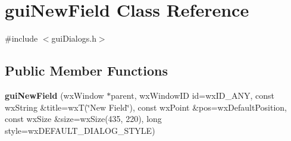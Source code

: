 \hypertarget{classgui_new_field}{
\section{guiNewField Class Reference}
\label{classgui_new_field}
}


{\ttfamily \#include $<$guiDialogs.h$>$}\subsection*{Public Member Functions}
\begin{DoxyCompactItemize}
\item 
\hypertarget{classgui_new_field_a4dbd56e6a4a05a0635929a2996b8eb51}{
{\bfseries guiNewField} (wxWindow $\ast$parent, wxWindowID id=wxID\_\-ANY, const wxString \&title=wxT(\char`\"{}New Field\char`\"{}), const wxPoint \&pos=wxDefaultPosition, const wxSize \&size=wxSize(435, 220), long style=wxDEFAULT\_\-DIALOG\_\-STYLE)}
\label{classgui_new_field_a4dbd56e6a4a05a0635929a2996b8eb51}

\end{DoxyCompactItemize}
